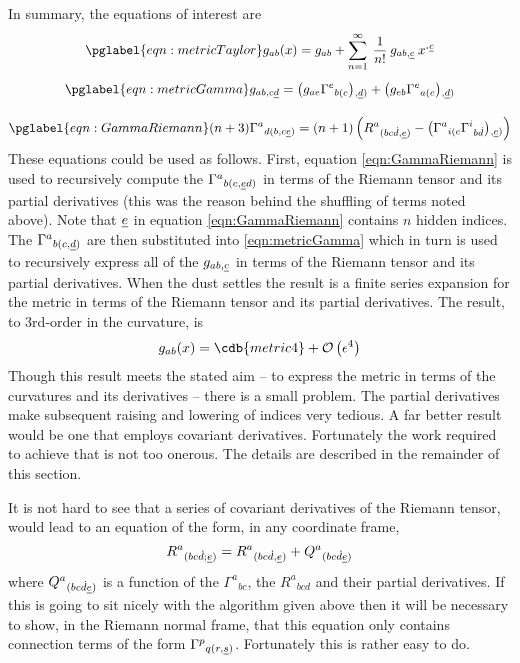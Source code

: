 \documentclass[a4paper,12pt]{article}
\numberwithin{equation}{section}
\begin{document}
In summary, the equations of interest are
\begin{gather}
\pglabel{eqn:metricTaylor}
g_{ab}(x) = g_{ab} + \sum_{n=1}^\infty\> \frac{1}{n!}\>g_{ab,\uc}\>x^{\Xdot\uc}\\[5pt]
\pglabel{eqn:metricGamma}
g_{ab,c\ud} = \left(g_{ae}\Gamma^{e}{}_{b(c}\right){}_{\!,\ud)}
             + \left(g_{eb}\Gamma^{e}{}_{a(c}\right){}_{\!,\ud)}\\[10pt]
\pglabel{eqn:GammaRiemann}
(n+3)\Gamma^a{}_{d(b,c\ue)} =
        (n+1)\left( R^a{}_{(bc\Dot d,\ue)}
                   - \left(\Gamma^a{}_{i(c}\Gamma^i{}_{b{\Dot d}}\right){}_{\!,\ue)}
              \right)
\end{gather}
These equations could be used as follows. First, equation \eqref{eqn:GammaRiemann} is used to
recursively compute the $\Gamma^a{}_{b(c,\ue d)}$ in terms of the Riemann tensor and its
partial derivatives (this was the reason behind the shuffling of terms noted above). Note
that $\ue$ in equation \eqref{eqn:GammaRiemann} contains $n$ hidden indices. The
$\Gamma^a{}_{b(c,\ud)}$ are then substituted into \eqref{eqn:metricGamma} which in turn is
used to recursively express all of the $g_{ab,\uc}$ in terms of the Riemann tensor and its
partial derivatives. When the dust settles the result is a finite series expansion for the
metric in terms of the Riemann tensor and its partial derivatives. The result, to 3rd-order
in the curvature, is
%
\begin{dmath*}g_{ab}(x) = \cdb{metric4} + \BigO{\eps^4}\end{dmath*}
%
Though this result meets the stated aim -- to express the metric in terms of the curvatures
and its derivatives -- there is a small problem. The partial derivatives make subsequent
raising and lowering of indices very tedious. A far better result would be one that employs
covariant derivatives. Fortunately the work required to achieve that is not too onerous. The
details are described in the remainder of this section.

It is not hard to see that a series of covariant derivatives of the Riemann tensor,
would lead to an equation of the form, in any coordinate frame,
\begin{equation*}
R^{a}{}_{(bc{\Dot d};\ue)} = R^{a}{}_{(bc{\Dot d},\ue)} + Q^{a}{}_{(bc{\Dot d}\ue)}
\end{equation*}
where $Q^{a}{}_{(bc{\Dot d}\ue)}$ is a function of the $\Gamma^{a}{}_{bc}$, the
$R^{a}{}_{bcd}$ and their partial derivatives. If this is going to sit nicely with the
algorithm given above then it will be necessary to show, in the Riemann normal frame, that
this equation only contains connection terms of the form $\Gamma^{p}{}_{q(r,\us)}$.
Fortunately this is rather easy to do.
\end{document}
